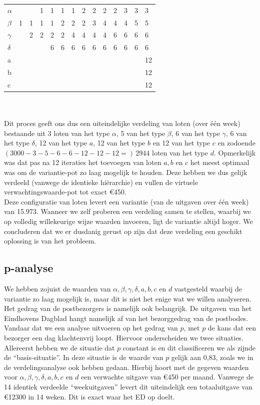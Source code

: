 \begin{tabular}{|l|l l l l l l l l l l l l|| l||}
\hline
$\alpha$	&	&	&1	&1	&1	&1	&2	&2	&2	&2	&3	&3	&3	\\
$\beta$	&1	&1	&1	&1	&2	&2	&2	&3	&4	&4	&4	&5	&5	\\
$\gamma$	&	&2	&2	&2	&2	&4	&4	&4	&4	&6	&6	&6	&6	\\
$\delta$	&	&	&	&6	&6	&6	&6	&6	&6	&6	&6	&6	&6	\\
a		&	&	&	&	&	&	&	&	&	&	&	&	&12	\\
b		&	&	&	&	&	&	&	&	&	&	&	&	&12	\\
c		&	&	&	&	&	&	&	&	&	&	&	&	&12	\\
\hline
\end{tabular}\\
\\

Dit proces geeft ons dus een uiteindelijke verdeling van loten (over één week) bestaande uit 3 loten van het type $\alpha$, 5 van het type $\beta$, 6 van het type $\gamma$, 6 van het type $\delta$, 12 van het type $a$, 12 van het type $b$ en 12 van het type $c$ en zodoende $(3000-3-5-6-6-12-12-12=)\,2944$ loten van het type $d$. Opmerkelijk was dat pas na 12 iteraties het toevoegen van loten $a,b$ en $c$ het meest optimaal was om de variantie-pot zo laag mogelijk te houden. Deze hebben we dus gelijk verdeeld (vanwege de identieke hi\"erarchie) en vullen de virtuele verwachtingswaarde-pot tot exact \euro450.\\

Deze configuratie van loten levert een variantie (van de uitgaven over één week) van 15.973. Wanneer we zelf proberen een verdeling samen te stellen, waarbij we op volledig willekeurige wijze waarden invoeren, ligt de variantie altijd hoger. We concluderen dat we er dusdanig gerust op zijn dat deze verdeling een geschikt oplossing is van het probleem.

\subsection{p-analyse}

We hebben zojuist de waarden van $\alpha, \beta, \gamma, \delta, a,b,c$ en $d$ vastgesteld waarbij de variantie zo laag mogelijk is, maar dit is niet het enige wat we willen analyseren.\\

Het gedrag van de postbezorgers is namelijk ook belangrijk. De uitgaven van het Eindhovens Dagblad hangt namelijk af van het bezorggedrag van de postbodes.  Vandaar dat we een analyse uitvoeren op het gedrag van $p$, met $p$ de kans dat een bezorger een dag klachtenvrij loopt. Hiervoor onderscheiden we twee situaties. Allereerst hebben we de situatie dat $p$ constant is en dit classificeren we als zijnde de ``basis-situatie''. In deze situatie is de waarde van $p$ gelijk aan 0,83, zoals we in de verdelingsanalyse ook hebben gedaan. Hierbij hoort met de gegeven waarden voor $\alpha, \beta, \gamma, \delta, a,b,c$ en $d$ een verwachte uitgave van \euro450 per maand. Vanwege de 14 identiek verdeelde ``weekuitgaven'' levert dit uiteindelijk een totaaluitgave van \euro12300 in 14 weken. Dit is exact waar het ED op doelt.\\

